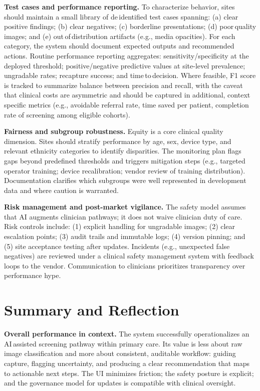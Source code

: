 \documentclass[sigplan,screen]{acmart}
\begin{document}
\textbf{Test cases and performance reporting.} To characterize behavior, sites should maintain a small library of de\,identified test cases spanning: (a) clear positive findings; (b) clear negatives; (c) borderline presentations; (d) poor\,quality images; and (e) out\,of\,distribution artifacts (e.g., media opacities). For each category, the system should document expected outputs and recommended actions. Routine performance reporting aggregates: sensitivity/specificity at the deployed threshold; positive/negative predictive values at site-level prevalence; ungradable rates; recapture success; and time\,to\,decision. Where feasible, F1 score is tracked to summarize balance between precision and recall, with the caveat that clinical costs are asymmetric and should be captured in additional, context\,specific metrics (e.g., avoidable referral rate, time saved per patient, completion rate of screening among eligible cohorts).

\textbf{Fairness and subgroup robustness.} Equity is a core clinical quality dimension. Sites should stratify performance by age, sex, device type, and relevant ethnicity categories to identify disparities. The monitoring plan flags gaps beyond predefined thresholds and triggers mitigation steps (e.g., targeted operator training; device recalibration; vendor review of training distribution). Documentation clarifies which subgroups were well represented in development data and where caution is warranted\cite{fda2018denovo_summary}.

\textbf{Risk management and post-market vigilance.} The safety model assumes that AI augments clinician pathways; it does not waive clinician duty of care. Risk controls include: (1) explicit handling for ungradable images; (2) clear escalation points; (3) audit trails and immutable logs; (4) version pinning; and (5) site acceptance testing after updates. Incidents (e.g., unexpected false negatives) are reviewed under a clinical safety management system with feedback loops to the vendor. Communication to clinicians prioritizes transparency over performance hype\cite{fda2025aiml}.

\section{Summary and Reflection}
\textbf{Overall performance in context.} The system successfully operationalizes an AI\,assisted screening pathway within primary care. Its value is less about raw image classification and more about consistent, auditable workflow: guiding capture, flagging uncertainty, and producing a clear recommendation that maps to actionable next steps. The UI minimizes friction; the safety posture is explicit; and the governance model for updates is compatible with clinical oversight.
\end{document}
